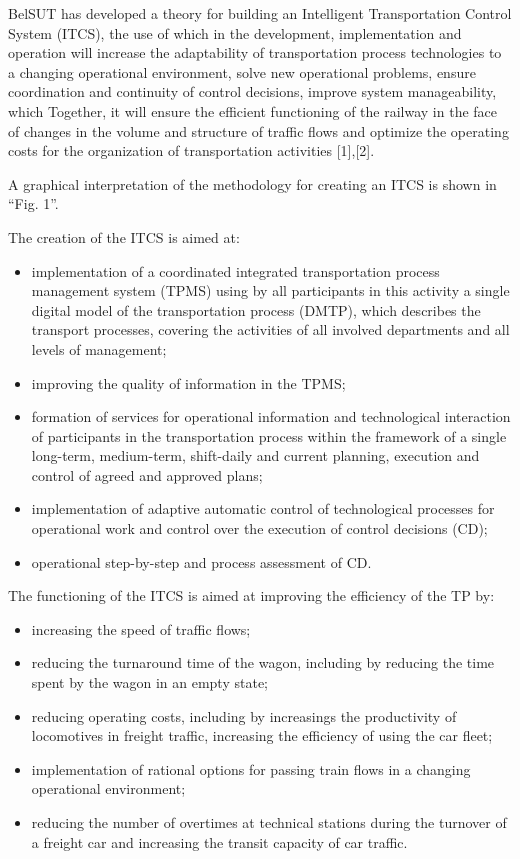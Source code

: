 \documentclass{article}
\begin{document}
\begin{multicols}{2}
 
BelSUT has developed a theory for building an Intelligent Transportation Control System (ITCS), the use of
which in the development, implementation and operation
will increase the adaptability of transportation process
technologies to a changing operational environment,
solve new operational problems, ensure coordination and
continuity of control decisions, improve system manageability, which Together, it will ensure the efficient
functioning of the railway in the face of changes in
the volume and structure of traffic flows and optimize
the operating costs for the organization of transportation
activities [1],[2].


 
 A graphical interpretation of the methodology for
creating an ITCS is shown in “Fig. 1”.

 The creation of the ITCS is aimed at:
\begin{itemize}[noitemsep]
    \item implementation of a coordinated integrated transportation process management system (TPMS) using by all participants in this activity a single
digital model of the transportation process (DMTP),
which describes the transport processes, covering
the activities of all involved departments and all
levels of management;
    \item  improving the quality of information in the TPMS;
    \item formation of services for operational information
and technological interaction of participants in the
transportation process within the framework of a
single long-term, medium-term, shift-daily and current planning, execution and control of agreed and
approved plans;
    \item implementation of adaptive automatic control of
technological processes for operational work and
control over the execution of control decisions (CD);
    \item operational step-by-step and process assessment of
CD.
\end{itemize}

 The functioning of the ITCS is aimed at improving the
efficiency of the TP by:
\begin{itemize}[noitemsep]
    \item increasing the speed of traffic flows;
    \item reducing the turnaround time of the wagon, including by reducing the time spent by the wagon in an
empty state;
    \item reducing operating costs, including by increasings
the productivity of locomotives in freight traffic,
increasing the efficiency of using the car fleet;
    \item implementation of rational options for passing train
flows in a changing operational environment;
    \item reducing the number of overtimes at technical stations during the turnover of a freight car and increasing the transit capacity of car traffic.
    

\end{itemize}
\end{multicols}
\end{document}
